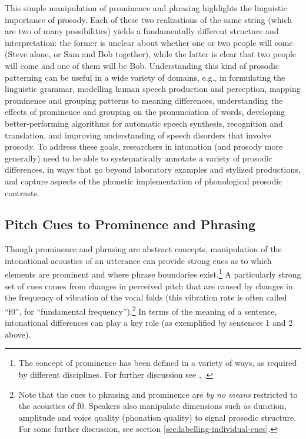 This simple manipulation of prominence and phrasing highlights the linguistic importance of prosody. Each of these two realizations of the same string (which are two of many possibilities) yields a fundamentally different structure and interpretation: the former is unclear about whether one or two people will come (Steve alone, or Sam and Bob together), while the latter is clear that two people will come and one of them will be Bob. Understanding this kind of prosodic patterning can be useful in a wide variety of domains, e.g., in formulating the linguistic grammar, modelling human speech production and perception, mapping prominence and grouping patterns to meaning differences, understanding the effects of prominence and grouping on the pronunciation of words, developing better-performing algorithms for automatic speech synthesis, recognition and translation, and improving understanding of speech disorders that involve prosody. To address these goals, researchers in intonation (and prosody more generally) need to be able to systematically annotate a variety of prosodic differences, in ways that go beyond laboratory examples and stylized productions, and capture aspects of the phonetic implementation of phonological prosodic contrasts.

\subsection{Pitch Cues to Prominence and Phrasing}\label{sec:pitch-cues-to-prominence-and-phrasing}

Though prominence and phrasing are abstract concepts, manipulation of the intonational acoustics of an utterance can provide strong cues as to which elements are prominent and where phrase boundaries exist.\footnote{The concept of prominence has been defined in a variety of ways, as required by different disciplines. For further discussion see \citealt{gussenhoven15}, \citealt{wagner-15}.} A particularly strong set of cues comes from changes in perceived pitch that are caused by changes in the frequency of vibration of the vocal folds (this vibration rate is often called “f0”, for “fundamental frequency”).\footnote{Note that the cues to phrasing and prominence are \textit{by no means} restricted to the acoustics of f0.  Speakers also manipulate dimensions such as duration, amplitude and voice quality (phonation quality) to signal prosodic structure. For some further discussion, see section \ref{sec:labelling-individual-cues}.} In terms of the meaning of a sentence, intonational differences can play a key role (as exemplified by sentences 1 and 2 above).

